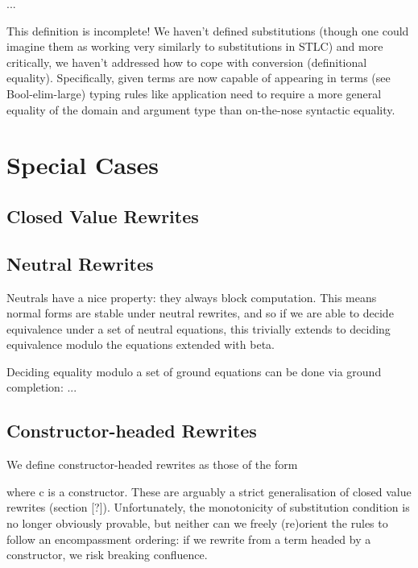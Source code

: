 \documentclass[
    a4paper, %
    fontsize=9.5pt, %
    twoside=false, %
	numbers=noenddot, %
	fontmethod=tex, %
]{kaobook}
\newcommand{\Varid}[1]{\mathit{#1}}
\def\resethooks{%
  \global\let\SaveRestoreHook\empty
  \global\let\ColumnHook\empty}
\let\hspre\empty
\let\hspost\empty
\renewcommand\Varid[1]{\mathord{\textsf{#1}}}
\begin{document}
...

This definition is incomplete! We haven't defined substitutions (though one
could imagine them as working very similarly to substitutions in STLC) and more
critically, we haven't addressed how to cope with conversion (definitional
equality). Specifically, given terms are now capable of appearing in terms
(see Bool-elim-large) typing rules like application need to require a more
general equality of the domain and argument type than on-the-nose syntactic
equality.

\section{Special Cases}

\subsection{Closed Value Rewrites}

\subsection{Neutral Rewrites}

Neutrals have a nice property: they always block computation. 
This means normal forms are stable under neutral rewrites, and so if we are
able to decide equivalence under a set of neutral equations, this trivially
extends to deciding equivalence modulo the equations extended with beta.

Deciding equality modulo a set of ground equations can be done via ground
completion: ...

\subsection{Constructor-headed Rewrites}

We define constructor-headed rewrites as those of the form

\begin{hscode}\SaveRestoreHook
\column{B}{@{}>{\hspre}l<{\hspost}@{}}%
\column{E}{@{}>{\hspre}l<{\hspost}@{}}%
\>[B]{}\Varid{tⁿᵉ}\;\Varid{↦}\;\Varid{c}\;\Varid{u₁}\;\Varid{...}\;\Varid{u₁}{}\<[E]%
\ColumnHook
\end{hscode}\resethooks

where c is a constructor. These are arguably a strict generalisation of closed
value rewrites (section [?]). Unfortunately, the monotonicity of substitution
condition is no longer obviously provable, but neither can we freely (re)orient 
the rules to follow an encompassment ordering: if we rewrite from a term headed
by a constructor, we risk breaking confluence.
\end{document}
